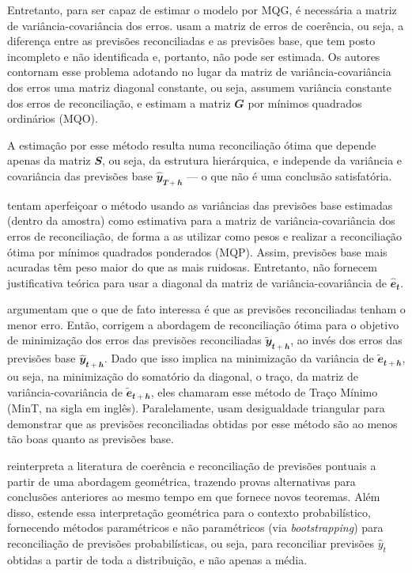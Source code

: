 \documentclass[
  12pt,
  oneside,
  a4paper,
  chapter=TITLE,
  section=TITLE,
  brazil]{abntex2}
\begin{document}
Entretanto, para ser capaz de estimar o modelo por MQG, é necessária a
matriz de variância-covariância dos erros.
\textcite{hyndman_optimal_2011} usam a matriz de erros de coerência, ou
seja, a diferença entre as previsões reconciliadas e as previsões base,
que tem posto incompleto e não identificada e, portanto, não pode ser
estimada. Os autores contornam esse problema adotando no lugar da matriz
de variância-covariância dos erros uma matriz diagonal constante, ou
seja, assumem variância constante dos erros de reconciliação, e estimam
a matriz \(\mathbfit{G}\) por mínimos quadrados ordinários (MQO).

A estimação por esse método resulta numa reconciliação ótima que depende
apenas da matriz \(\mathbfit{S}\), ou seja, da estrutura hierárquica, e
independe da variância e covariância das previsões base
\(\mathbfit{\hat{y}_{T+h}}\) --- o que não é uma conclusão satisfatória.

\textcite{hyndman_fast_2016} tentam aperfeiçoar o método usando as
variâncias das previsões base estimadas (dentro da amostra) como
estimativa para a matriz de variância-covariância dos erros de
reconciliação, de forma a as utilizar como pesos e realizar a
reconciliação ótima por mínimos quadrados ponderados (MQP). Assim,
previsões base mais acuradas têm peso maior do que as mais ruidosas.
Entretanto, não fornecem justificativa teórica para usar a diagonal da
matriz de variância-covariância de \(\mathbfit{\hat{e}_{t}}\).

\textcite{wickramasuriya_optimal_2019} argumentam que o que de fato
interessa é que as previsões reconciliadas tenham o menor erro. Então,
corrigem a abordagem de reconciliação ótima para o objetivo de
minimização dos erros das previsões reconciliadas
\(\mathbfit{\tilde{y}_{t+h}}\), ao invés dos erros das previsões base
\(\mathbfit{\hat{y}_{t+h}}\). Dado que isso implica na minimização da
variância de \(\mathbfit{\tilde{e}_{t+h}}\), ou seja, na minimização do
somatório da diagonal, o traço, da matriz de variância-covariância de
\(\mathbfit{\tilde{e}_{t+h}}\), eles chamaram esse método de Traço
Mínimo (MinT, na sigla em inglês). Paralelamente, usam desigualdade
triangular para demonstrar que as previsões reconciliadas obtidas por
esse método são ao menos tão boas quanto as previsões base.

\textcite{panagiotelis_forecast_2021} reinterpreta a literatura de
coerência e reconciliação de previsões pontuais a partir de uma
abordagem geométrica, trazendo provas alternativas para conclusões
anteriores ao mesmo tempo em que fornece novos teoremas. Além disso,
\textcite{panagiotelis_forecast_2021} estende essa interpretação
geométrica para o contexto probabilístico, fornecendo métodos
paramétricos e não paramétricos (via \emph{bootstrapping}) para
reconciliação de previsões probabilísticas, ou seja, para reconciliar
previsões \(\hat{y}_t\) obtidas a partir de toda a distribuição, e não
apenas a média.
\end{document}
